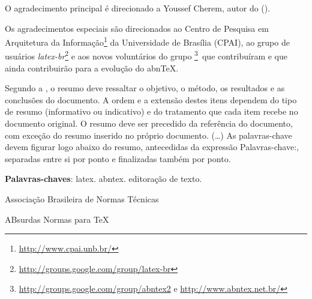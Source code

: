\documentclass[
	12pt,				%
	oneside,            %
	a4paper,			%
	english,			%
	french,				%
	spanish,			%
	brazil,				%
	]{abntex2}
\begin{document}
{\vspace*{\fill}
}

\begin{agradecimentos}
O agradecimento principal é direcionado a Youssef Cherem, autor do
 ().

Os agradecimentos especiais são direcionados ao Centro de Pesquisa em
Arquitetura da Informação\footnote{\url{http://www.cpai.unb.br/}} da Universidade de
Brasília (CPAI), ao grupo de usuários
\emph{latex-br}\footnote{\url{http://groups.google.com/group/latex-br}} e aos
novos voluntários do grupo
\emph{\abnTeX}\footnote{\url{http://groups.google.com/group/abntex2} e
\url{http://www.abntex.net.br/}}~que contribuíram e que ainda
contribuirão para a evolução do abn\TeX.

\end{agradecimentos}


\setlength{\absparsep}{18pt} %
\begin{resumo}
 Segundo a , o resumo deve ressaltar o
 objetivo, o método, os resultados e as conclusões do documento. A ordem e a extensão
 destes itens dependem do tipo de resumo (informativo ou indicativo) e do
 tratamento que cada item recebe no documento original. O resumo deve ser
 precedido da referência do documento, com exceção do resumo inserido no
 próprio documento. (\ldots) As palavras-chave devem figurar logo abaixo do
 resumo, antecedidas da expressão Palavras-chave:, separadas entre si por
 ponto e finalizadas também por ponto.

 \noindent
 \textbf{Palavras-chaves}: latex. abntex. editoração de texto.
\end{resumo}

\listoffigures*
\cleardoublepage

\listoftables*
\cleardoublepage

\begin{siglas}
  \item[ABNT] Associação Brasileira de Normas Técnicas
  \item[abnTeX] ABsurdas Normas para TeX
\end{siglas}
\end{document}
